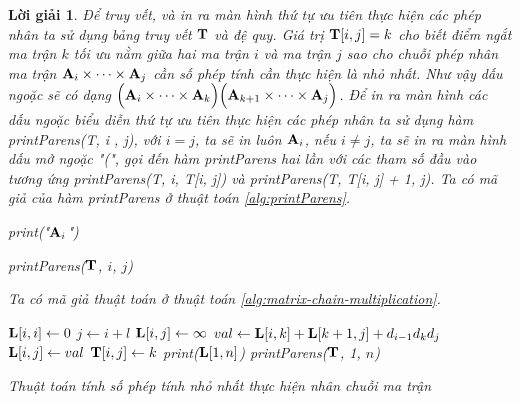 \documentclass[14pt, a4paper]{article}
\theoremstyle{sltheorem}
\theoremstyle{soltheorem}
\newtheorem*{loigiai}{Lời giải}
\begin{document}
\begin{loigiai}
    Để truy vết, và in ra màn hình thứ tự ưu tiên thực hiện các phép nhân ta sử dụng bảng truy vết $\bold{T}$ và đệ quy.
    Giá trị $\bold{T} \lbrack i, j \rbrack=k$ cho biết điểm ngắt ma trận $k$ tối ưu nằm giữa hai ma trận $i$ và ma trận $j$ sao cho chuỗi phép nhân ma trận $\bold{A}_i \times \dots \times \bold{A}_j$ cần số phép tính cần thực hiện là nhỏ nhất.
    Như vậy dấu ngoặc sẽ có dạng $\Big ( \bold{A}_i \times \dots \times \bold{A}_k \Big) \Big( \bold{A}_{k + 1} \times \dots \times \bold{A}_j \Big)$.
    Để in ra màn hình các dấu ngoặc biểu diễn thứ tự ưu tiên thực hiện các phép nhân ta sử dụng hàm printParens(T, i , j), với $i = j$, ta sẽ in luôn $\bold{A}_i$, nếu $i \neq j$, ta sẽ in ra màn hình dấu mở ngoặc "(", gọi đến hàm printParens hai lần với các tham số đầu vào tương ứng printParens(T, i, T[i, j])
    và printParens(T, T[i, j] + 1, j). Ta có mã giả của hàm printParens ở thuật toán \ref{alg:printParens}.

    \begin{algorithm}[h!]
        \DontPrintSemicolon

         {
            print("$\bold{A}_i$")\;
        } 
        \caption{printParens($\bold{T}$, $i$, $j$)}
        \label{alg:printParens}
    \end{algorithm}

    Ta có mã giả thuật toán ở thuật toán \ref{alg:matrix-chain-multiplication}.

    \begin{algorithm}[h!]
        \DontPrintSemicolon

         {
            $\bold{L} \lbrack i, i \rbrack \gets 0$\;
        }
         {
             {
                $j \gets i + l$\;
                $\bold{L} \lbrack i, j \rbrack \gets \infty$\;
                 {
                    $val \gets \bold{L} \lbrack i, k \rbrack + \bold{L} \lbrack k + 1, j \rbrack + d_{i-1} d_{k} d_{j}$\;
                     {
                        $\bold{L} \lbrack i, j \rbrack \gets val$\;
                        $\bold{T} \lbrack i, j \rbrack \gets k$
                    }
                }
            }
        }
        print($\bold{L} \lbrack 1, n \rbrack$)\;
        printParens($\bold{T}$, 1, $n$)\;
        \caption{Thuật toán tính số phép tính nhỏ nhất thực hiện nhân chuỗi ma trận}
        \label{alg:matrix-chain-multiplication}
    \end{algorithm}


\end{loigiai}
\end{document}
